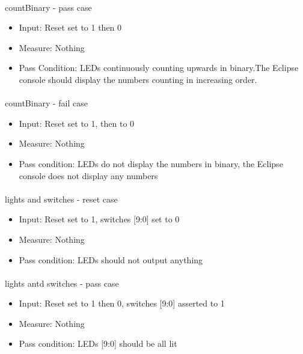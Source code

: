 \documentclass{article}
\begin{document}
    \paragraph{} countBinary - pass case
    \begin{itemize}
      \item Input: Reset set to 1 then 0
      \item Measure: Nothing
      \item Pass Condition: LEDs continuously counting upwards in binary.The Eclipse console should display the numbers counting in increasing order.
    \end{itemize}
    
    \paragraph{} countBinary - fail case
    \begin{itemize}
      \item Input: Reset set to 1, then to 0
      \item Measure: Nothing
      \item Pass condition: LEDs do not display the numbers in binary, the Eclipse console does not display any numbers
    \end{itemize}

    \paragraph{} lights and switches - reset case
    \begin{itemize}
      \item Input: Reset set to 1, switches [9:0] set to 0
      \item Measure: Nothing
      \item Pass condition: LEDs should not output anything
    \end{itemize}

    \paragraph{} lights antd switches - pass case
    \begin{itemize}
      \item Input: Reset set to 1 then 0, switches [9:0] asserted to 1
      \item Measure: Nothing
      \item Pass condition: LEDs [9:0] should be all lit
    \end{itemize}
\end{document}
